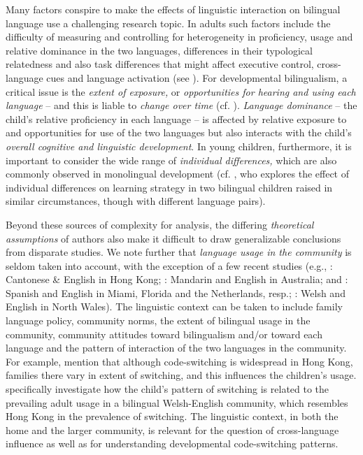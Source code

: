 \documentclass[output=paper]{langscibook}
\begin{document}
Many factors conspire to make the effects of linguistic interaction on bilingual language use a challenging research topic. In adults such factors include the difficulty of measuring and controlling for heterogeneity in proficiency, usage and relative dominance in the two languages, differences in their typological relatedness and also task differences that might affect executive control, cross-language cues and language activation (see \citealt{Grosjean1998,BaumTitone2014}). For developmental bilingualism, a critical issue is the \textit{extent of exposure,} or \textit{opportunities for hearing and using each language} – and this is liable to \textit{change over time} (cf. \citealt{TullochHoff2022}). \textit{Language dominance} – the child’s relative proficiency in each language – is affected by relative exposure to and opportunities for use of the two languages but also interacts with the child’s \textit{overall cognitive and linguistic development}. In young children, furthermore, it is important to consider the wide range of \textit{individual differences,} which are also commonly observed in monolingual development (cf. \citealt{Serratrice2005}, who explores the effect of individual differences on learning strategy in two bilingual children raised in similar circumstances, though with different language pairs).

Beyond these sources of complexity for analysis, the differing \textit{theoretical assumptions} of authors also make it difficult to draw generalizable conclusions from disparate studies. We note further that \textit{language usage in the community} is seldom taken into account, with the exception of a few recent studies (e.g., \citealt{YipMatthews2016}: Cantonese \& English in Hong Kong; \citealt{QidiBiase2020}: Mandarin and English in Australia; \citealt{BalamEtAl2021} and \citealt{vanOschEtAl2023}: Spanish and English in Miami, Florida and the Netherlands, resp.; \citealt{PhillipsDeuchar2022}: Welsh and English in North Wales).  The linguistic context can be taken to include family language policy, community norms, the extent of bilingual usage in the community, community attitudes toward bilingualism and/or toward each language and the pattern of interaction of the two languages in the community. For example, \citet{YipMatthews2016} mention that although code-switching is widespread in Hong Kong, families there vary in extent of switching, and this influences the children’s usage. \citet{PhillipsDeuchar2022} specifically investigate how the child’s pattern of switching is related to the prevailing adult usage in a bilingual Welsh-English community, which resembles Hong Kong in the prevalence of switching. The linguistic context, in both the home and the larger community, is relevant for the question of cross-language influence as well as for understanding developmental code-switching patterns.
\end{document}
